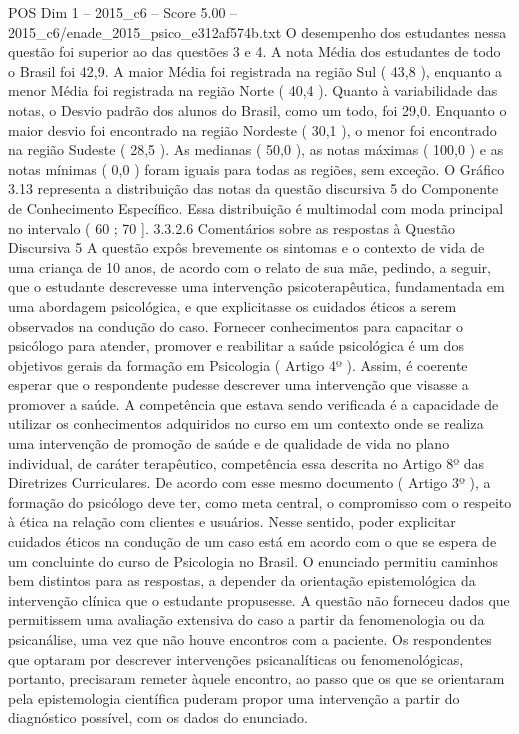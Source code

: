 \begin{textsample}{POS Dim 1 – 2015\_c6 – Score 5.00 – 2015\_c6/enade\_2015\_psico\_e312af574b.txt}
O desempenho dos estudantes nessa questão foi superior ao das questões 3 e 4.
A nota Média dos estudantes de todo o Brasil foi 42,9.
A maior Média foi registrada na região Sul ( 43,8 ), enquanto a menor Média foi registrada na região Norte ( 40,4 ).
Quanto à variabilidade das notas, o Desvio padrão dos alunos do Brasil, como um todo, foi 29,0.
Enquanto o maior desvio foi encontrado na região Nordeste ( 30,1 ), o menor foi encontrado na região Sudeste ( 28,5 ).
As medianas ( 50,0 ), as notas máximas ( 100,0 ) e as notas mínimas ( 0,0 ) foram iguais para todas as regiões, sem exceção.
O Gráfico 3.13 representa a distribuição das notas da questão discursiva 5 do Componente de Conhecimento Específico.
Essa distribuição é multimodal com moda principal no intervalo ( 60 ; 70 ]. 3.3.2.6 Comentários sobre as respostas à Questão Discursiva 5 A questão expôs brevemente os sintomas e o contexto de vida de uma criança de 10 anos, de acordo com o relato de sua mãe, pedindo, a seguir, que o estudante descrevesse uma intervenção psicoterapêutica, fundamentada em uma abordagem psicológica, e que explicitasse os cuidados éticos a serem observados na condução do caso.
Fornecer conhecimentos para capacitar o psicólogo para atender, promover e reabilitar a saúde psicológica é um dos objetivos gerais da formação em Psicologia ( Artigo 4º ).
Assim, é coerente esperar que o respondente pudesse descrever uma intervenção que visasse a promover a saúde.
A competência que estava sendo verificada é a capacidade de utilizar os conhecimentos adquiridos no curso em um contexto onde se realiza uma intervenção de promoção de saúde e de qualidade de vida no plano individual, de caráter terapêutico, competência essa descrita no Artigo 8º das Diretrizes Curriculares.
De acordo com esse mesmo documento ( Artigo 3º ), a formação do psicólogo deve ter, como meta central, o compromisso com o respeito à ética na relação com clientes e usuários.
Nesse sentido, poder explicitar cuidados éticos na condução de um caso está em acordo com o que se espera de um concluinte do curso de Psicologia no Brasil.
O enunciado permitiu caminhos bem distintos para as respostas, a depender da orientação epistemológica da intervenção clínica que o estudante propusesse.
A questão não forneceu dados que permitissem uma avaliação extensiva do caso a partir da fenomenologia ou da psicanálise, uma vez que não houve encontros com a paciente.
Os respondentes que optaram por descrever intervenções psicanalíticas ou fenomenológicas, portanto, precisaram remeter àquele encontro, ao passo que os que se orientaram pela epistemologia científica puderam propor uma intervenção a partir do diagnóstico possível, com os dados do enunciado.

\end{textsample}
